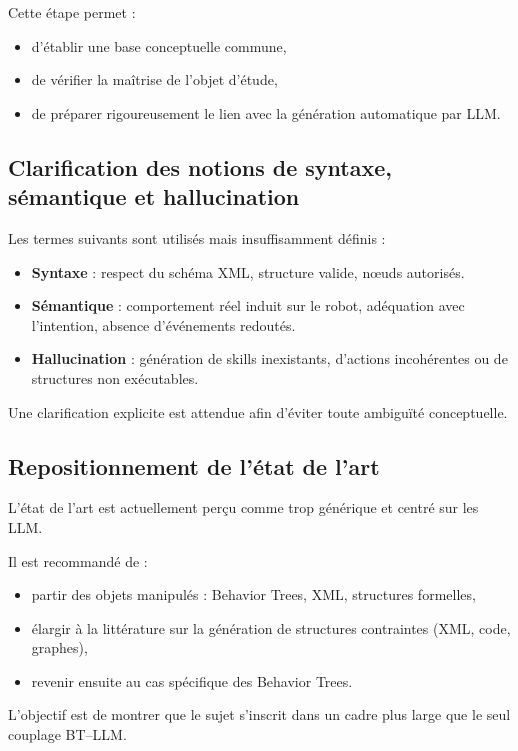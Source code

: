 \documentclass[11pt,a4paper]{article}
\begin{document}
Cette étape permet :
\begin{itemize}
    \item d’établir une base conceptuelle commune,
    \item de vérifier la maîtrise de l’objet d’étude,
    \item de préparer rigoureusement le lien avec la génération automatique par LLM.
\end{itemize}

\subsection{Clarification des notions de syntaxe, sémantique et hallucination}

Les termes suivants sont utilisés mais insuffisamment définis :
\begin{itemize}
    \item \textbf{Syntaxe} : respect du schéma XML, structure valide, nœuds autorisés.
    \item \textbf{Sémantique} : comportement réel induit sur le robot, adéquation avec l’intention, absence d’événements redoutés.
    \item \textbf{Hallucination} : génération de skills inexistants, d’actions incohérentes ou de structures non exécutables.
\end{itemize}

Une clarification explicite est attendue afin d’éviter toute ambiguïté conceptuelle.

\subsection{Repositionnement de l’état de l’art}

L’état de l’art est actuellement perçu comme trop générique et centré sur les LLM.

Il est recommandé de :
\begin{itemize}
    \item partir des objets manipulés : Behavior Trees, XML, structures formelles,
    \item élargir à la littérature sur la génération de structures contraintes (XML, code, graphes),
    \item revenir ensuite au cas spécifique des Behavior Trees.
\end{itemize}

L’objectif est de montrer que le sujet s’inscrit dans un cadre plus large que le seul couplage BT--LLM.
\end{document}
